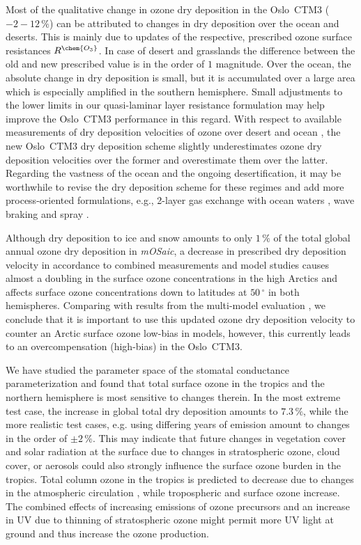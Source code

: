 \documentclass[gmd, manuscript]{copernicus}
\begin{document}
Most of the qualitative change in ozone dry deposition in the Oslo~CTM3 ($-2-12\,\unit{\%}$) can be attributed to changes in dry deposition over the ocean and deserts. This is mainly due to updates of the respective, prescribed ozone surface resistances $R^\chem{O_3}$. In case of desert and grasslands the difference between the old and new prescribed value is in the order of $1$ magnitude. Over the ocean, the absolute change in dry deposition is small, but it is accumulated over a large area which is especially amplified in the southern hemisphere. Small adjustments to the lower limits in our quasi-laminar layer resistance formulation may help improve the Oslo~CTM3 performance in this regard. With respect to available measurements of dry deposition velocities of ozone over desert \citep{AE:Gusten1995} and ocean \citep{JGR:Helmig2012}, the new Oslo~CTM3 dry deposition scheme slightly underestimates ozone dry deposition velocities over the former and overestimate them over the latter. Regarding the vastness of the ocean and the ongoing desertification, it may be worthwhile to revise the dry deposition scheme for these regimes and add more process-oriented formulations, e.g., 2-layer gas exchange with ocean waters \citep{ACP:Luhar2017, ACP:Luhar2018}, wave braking and spray \citep{ACP:Pozzer2006}.

Although dry deposition to ice and snow amounts to only $1\,\unit{\%}$ of the total global annual ozone dry deposition in \emph{mOSaic}, a decrease in prescribed dry deposition velocity in accordance to combined measurements and model studies \citep{ACP:Helmig2007} causes almost a doubling in the surface ozone concentrations in the high Arctics and affects surface ozone concentrations down to latitudes at $50\,\unit{^\circ}$ in both hemispheres. Comparing with results from the multi-model evaluation \citep{ACP:Hardacre2015}, we conclude that it is important to use this updated ozone dry deposition velocity to counter an Arctic surface ozone low-bias in models, however, this currently leads to an overcompensation (high-bias) in the Oslo~CTM3.

We have studied the parameter space of the stomatal conductance parameterization and found that total surface ozone in the tropics and the northern hemisphere is most sensitive to changes therein. In the most extreme test case, the increase in global total dry deposition amounts to $7.3\,\unit{\%}$, while the more realistic test cases, e.g. using differing years of emission amount to changes in the order of $\pm 2\,\unit{\%}$. This may indicate that future changes in vegetation cover and solar radiation at the surface due to changes in stratospheric ozone, cloud cover, or aerosols could also strongly influence the surface ozone burden in the tropics. Total column ozone in the tropics is predicted to decrease due to changes in the atmospheric circulation \citep[e.g.,][]{WMO2014}, while tropospheric and surface ozone increase. The combined effects of increasing emissions of ozone precursors and an increase in UV due to thinning of stratospheric ozone might permit more UV light at ground and thus increase the ozone production.
\end{document}
